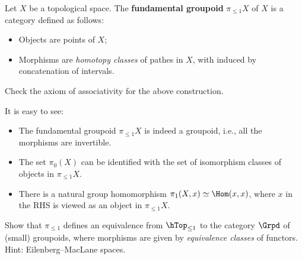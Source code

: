 \begin{constr}
	Let $X$ be a topological space. The \textbf{fundamental groupoid} $\pi_{\le 1} X$ of $X$ is a category defined as follows:
	\begin{itemize}
		\item 
			Objects are points of $X$;
		\item 
			Morphisms are \emph{homotopy classes} of pathes in $X$, with induced by concatenation of intervals.
	\end{itemize}
\end{constr}

\begin{exe}
	Check the axiom of associativity for the above construction.
\end{exe}

\ssec{}

It is easy to see:
\begin{itemize}
	\item
		The fundamental groupoid $\pi_{\le 1} X$ is indeed a groupoid, i.e., all the morphisms are invertible.
	\item 
		The set $\pi_0(X)$ can be identified with the set of isomorphism classes of objects in $\pi_{\le 1}X$.
	\item
		There is a natural group homomorphism $\pi_1(X,x) \simeq \Hom(x,x)$, where $x$ in the RHS is viewed as an object in $\pi_{\le 1}X$.
\end{itemize}

\medskip

\begin{exe}
	Show that $\pi_{\le 1}$ defines an equivalence from $\hTop_{\le 1}$ to the category $\Grpd$ of (small) groupoids, where morphisms are given by \emph{equivalence classes} of functors. Hint: Eilenberg–MacLane spaces.
\end{exe}

\ssec{}

